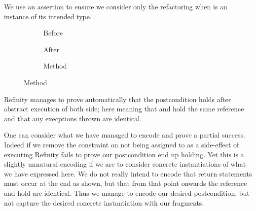 We use an assertion to ensure we consider only the refactoring when  is an instance of its intended type.

\begin{figure}[!h]
  \centering
  \begin{subfigure}[b]{.34\linewidth}
    
    \caption{Before}
    \label{lst:ExtractVariable-refinity-before}
  \end{subfigure}\hspace{1cm}
  \begin{subfigure}[b]{.34\linewidth}
    
    \caption{After}
    \label{lst:ExtractVariable-refinity-after}
  \end{subfigure}\vspace{1mm}
  \begin{subfigure}[b]{.65\linewidth}
    
    \caption{Method}
    \label{lst:ExtractVariable-refinity-method}
  \end{subfigure}
\label{lst:ExtractVariable-refinity}
\end{figure}

Refinity manages to prove automatically that the postcondition holds after abstract execution of both side; here meaning that
 and  hold the same reference and that any execptions thrown are identical.

One can consider what we have managed to encode and prove a partial success.
Indeed if we remove the constraint on  not being assigned to as a side-effect of executing   Refinity fails to prove our postcondition end up holding.
Yet this is a slightly unnatural encoding if we are to consider concrete instantiations of what we have expressed here.
We do not really intend to encode that return statements must occur at the end as shown, but that from that point onwards the reference  and  hold
are identical. Thus we manage to encode our desired postcondition, but not capture the desired concrete instantiation with our fragments.

